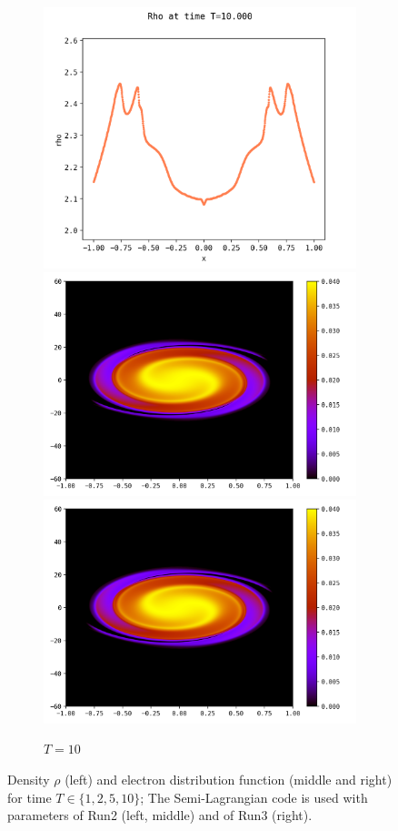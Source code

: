 \documentclass{article}
\numberwithin{equation}{section}
\newcommand{\mysubcaption}[1]{
	\vspace*{5pt}
	\begin{minipage}{0.8\linewidth}
		\begin{center}
			\footnotesize\emph{#1}
		\end{center}
	\end{minipage}
}
\newcommand{\imh}{\textheight} %
\begin{document}
\begin{figure}
	\begin{subfigure}{\textwidth}
		\centering
		\includegraphics[height=\imh,width=0.3\linewidth]{images/rhoT10.png}
		\includegraphics[height=\imh,width=0.3\linewidth]{images/feT10.png}
		\includegraphics[height=\imh,width=0.3\linewidth]{images/feT10_run_job2.png}
		\caption{$T=10$}
	\end{subfigure}


	\caption{Density $\rho$ (left) and electron distribution function (middle and right) for time $T\in \{1,2,5,10\}$; 
	 The Semi-Lagrangian code is used with parameters of Run2 (left, middle) and of Run3 (right).
	}
	\label{fig:comp_temps}
\end{figure}  




\end{document}
